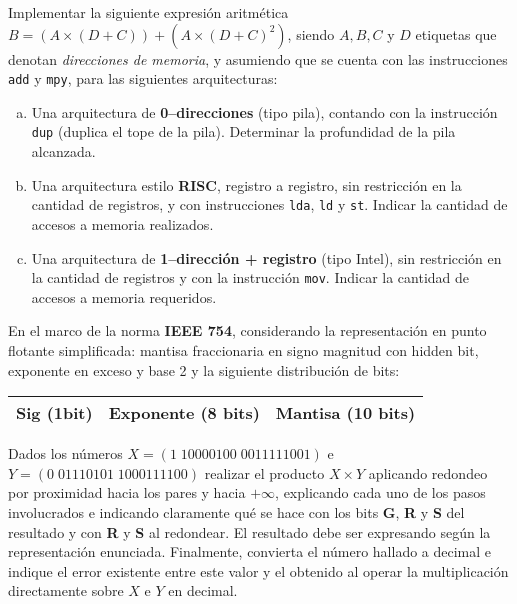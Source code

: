 \documentclass[12pt,a4paper]{article}
\begin{document}

Implementar la siguiente expresión aritmética $B = (A \times (D + C))  + (A \times (D + C)^2)$, siendo $A, B, C$ y $D$ etiquetas que denotan \textit{direcciones de memoria}, y asumiendo que se cuenta con las instrucciones \texttt{add} y \texttt{mpy}, para las siguientes arquitecturas:
\begin{enumerate}[a)]
	\item Una arquitectura de \textbf{0--direcciones} (tipo pila), contando con la instrucción \texttt{dup} (duplica el tope de la pila). Determinar la profundidad de la pila alcanzada. 
	
	\item Una arquitectura estilo \textbf{RISC}, registro a registro, sin restricción en la cantidad de registros, y con instrucciones \texttt{lda}, \texttt{ld} y \texttt{st}. Indicar la cantidad de accesos a memoria realizados.
	
	\item Una arquitectura de \textbf{1--dirección + registro} (tipo Intel), sin restricción en la cantidad de registros y con la instrucción \texttt{mov}. Indicar la cantidad de accesos a memoria requeridos.	
\end{enumerate}

 En el marco de la norma \textbf{IEEE 754}, considerando la representación en punto flotante simplificada: mantisa fraccionaria en signo magnitud con hidden bit, exponente en exceso y base 2 y la siguiente distribución de bits:
\begin{center}
	\begin{tabular}{|c|c|c|}\hline
		Sig (1bit) & Exponente (8 bits) & Mantisa (10 bits)\\\hline
	\end{tabular}
\end{center}

Dados los números $X = (1\; 10000100\; 0011111001)$ e $Y = (0\; 01110101 \; 1000111100)$ realizar el producto $X \times Y$ aplicando redondeo por proximidad hacia los pares y hacia $+\infty$, explicando cada uno de los pasos involucrados e indicando claramente qué se hace con los bits \textbf{G}, \textbf{R} y \textbf{S} del resultado y con \textbf{R} y \textbf{S} al redondear. El resultado debe ser expresando según la representación enunciada. Finalmente, convierta el número hallado a decimal e indique el error existente entre este valor y el obtenido al operar la multiplicación directamente sobre $X$ e $Y$ en decimal.
\end{document}
